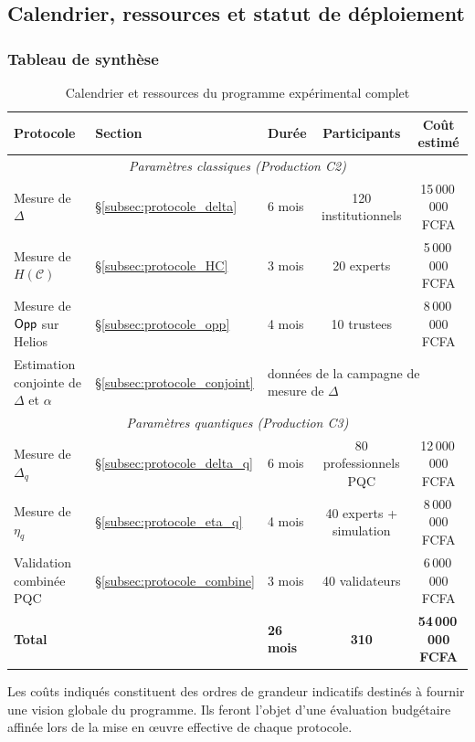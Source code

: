 \subsection{Calendrier, ressources et statut de d\'eploiement}
\label{subsec:calendrier_ressources}
\begin{sloppypar}

\subsubsection{Tableau de synth\`ese}
\label{subsubsec:tableau_synthese}

\begin{table}[htbp]
\centering
\caption{Calendrier et ressources du programme exp\'erimental complet}
\label{tab:programme_experimental}
\begin{threeparttable}
\begin{tabular}{@{}lllcc@{}}
\toprule
\textbf{Protocole} & \textbf{Section} & \textbf{Dur\'ee} &
\textbf{Participants} & \textbf{Co\^ut estim\'e\tnote{$\star$}} \\
\midrule
\multicolumn{5}{c}{\textit{Param\`etres classiques (Production C2)}} \\
\midrule
Mesure de $\Delta$ & \S\ref{subsec:protocole_delta} & 6 mois & 120 institutionnels & 15\,000\,000 FCFA \\
Mesure de $H(\mathcal{C})$ & \S\ref{subsec:protocole_HC} & 3 mois & 20 experts & 5\,000\,000 FCFA \\
Mesure de $\mathsf{Opp}$ sur Helios & \S\ref{subsec:protocole_opp} & 4 mois & 10 trustees & 8\,000\,000 FCFA \\
Estimation conjointe de $\Delta$ et $\alpha$ & \S\ref{subsec:protocole_conjoint} & \multicolumn{3}{l}{\footnotesize donn\'ees de la campagne de mesure de $\Delta$} \\
\midrule
\multicolumn{5}{c}{\textit{Param\`etres quantiques (Production C3)}} \\
\midrule
Mesure de $\Delta_q$ & \S\ref{subsec:protocole_delta_q} & 6 mois & 80 professionnels PQC & 12\,000\,000 FCFA \\
Mesure de $\eta_q$ & \S\ref{subsec:protocole_eta_q} & 4 mois & 40 experts + simulation & 8\,000\,000 FCFA \\
Validation combin\'ee PQC & \S\ref{subsec:protocole_combine} & 3 mois & 40 validateurs & 6\,000\,000 FCFA \\
\midrule
\textbf{Total} & & \textbf{26 mois} & \textbf{310} &
\textbf{54\,000\,000 FCFA} \\
\bottomrule
\end{tabular}
\begin{tablenotes}
\footnotesize
\item[$\star$] Les co\^uts indiqu\'es constituent des ordres de grandeur
indicatifs destin\'es \`a fournir une vision globale du programme.
Ils feront l'objet d'une \'evaluation budg\'etaire affin\'ee lors de la
mise en \oe uvre effective de chaque protocole.
\end{tablenotes}
\end{threeparttable}
\end{table}


\end{sloppypar}
